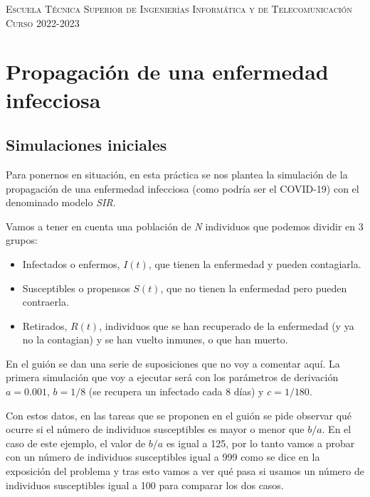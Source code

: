\documentclass[11pt,a4paper]{report}
\begin{document}
\begin{titlepage}
\begin{minipage}{\textwidth}
\vspace{0.7cm}
\textsc{Escuela Técnica Superior de Ingenierías Informática y de Telecomunicación}\\
\vspace{1cm}
\textsc{Curso 2022-2023}
\end{minipage}
\end{titlepage}

\tableofcontents
\thispagestyle{empty}				%

\newpage

\setlength{\parskip}{1em}

\chapter{Propagación de una enfermedad infecciosa}

\newpage

\section{Simulaciones iniciales}

Para ponernos en situación, en esta práctica se nos plantea la simulación de la propagación de una enfermedad infecciosa (como podría ser el COVID-19) con el denominado modelo \textit{SIR}.

Vamos a tener en cuenta una población de \textit{N} individuos que podemos dividir en 3 grupos:

\begin{itemize}
	\item{Infectados o enfermos, $I(t)$, que tienen la enfermedad y pueden contagiarla.}
	\item{Susceptibles o propensos $S(t)$, que no tienen la enfermedad pero pueden contraerla.}
	\item{Retirados, $R(t)$, individuos que se han recuperado de la enfermedad (y ya no la contagian) y se han vuelto inmunes, o que han muerto.} 
\end{itemize}

En el guión se dan una serie de suposiciones que no voy a comentar aquí. La primera simulación que voy a ejecutar será con los parámetros de derivación $a=0.001$, $b=1/8$ (se recupera un infectado cada 8 días) y $c=1/180$.

Con estos datos, en las tareas que se proponen en el guión se pide observar qué ocurre si el número de individuos susceptibles es mayor o menor que $b/a$. En el caso de este ejemplo, el valor de $b/a$ es igual a 125, por lo tanto vamos a probar con un número de individuos susceptibles igual a 999 como se dice en la exposición del problema y tras esto vamos a ver qué pasa si usamos un número de individuos susceptibles igual a 100 para comparar los dos casos.
\end{document}
